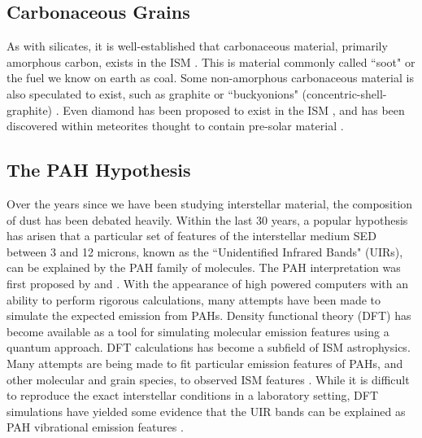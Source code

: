 \subsection{Carbonaceous Grains}
     As with silicates, it is well-established that carbonaceous material, primarily amorphous carbon, exists in the ISM \citep{aitken81,tielens87}. This is material commonly called ``soot" or the fuel we know on earth as coal.    Some non-amorphous carbonaceous material is also speculated to exist, such as graphite \citep{zhou06} or ``buckyonions" (concentric-shell-graphite) \citep{li08}. Even diamond has been proposed to exist in the ISM \citep{tielens87}, and has been discovered within meteorites thought to contain pre-solar material \citep{anders93}.
\subsection{The PAH Hypothesis}
\label{PAHhypothesis}
     Over the years since we have been studying interstellar material, the composition of dust has been debated heavily. 
     Within  the last 30 years, a popular hypothesis has arisen that a particular set of features of the interstellar medium SED between 3 and 12 microns, known as the ``Unidentified Infrared Bands" (UIRs), can be explained by the PAH family of molecules. The PAH interpretation was first proposed by \cite{allamandola85} and \cite{puget85}.
     With the appearance of high powered computers with an ability to perform rigorous calculations, many attempts have been made to simulate the expected emission from PAHs. Density functional theory (DFT) \citep{honenberg64} has become available as a tool for simulating molecular emission features using a quantum approach. DFT calculations has become a subfield of ISM astrophysics. Many attempts are being made to fit particular emission features of PAHs, and other molecular and grain species, to observed ISM features \citep{hammonds09,hirata99}.
     While it is difficult to reproduce the exact interstellar conditions in a laboratory setting, DFT simulations have yielded some evidence that the UIR bands can be explained as PAH vibrational emission features \citep{pathak12,ricca11,yu12}.

